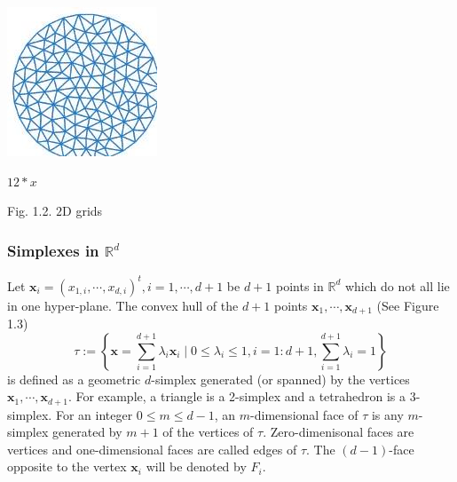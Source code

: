 \documentclass[10pt]{article}
\begin{document}
\includegraphics[max width=\textwidth]{2022_01_05_15c63bf4a948497c30d9g-05(2)}

$12 * x$

Fig. 1.2. $2 \mathrm{D}$ grids

\subsubsection{Simplexes in $\mathbb{R}^{d}$}
Let $\boldsymbol{x}_{i}=\left(x_{1, i}, \cdots, x_{d, i}\right)^{t}, i=1, \cdots, d+1$ be $d+1$ points in $\mathbb{R}^{d}$ which do not all lie in one hyper-plane. The convex hull of the $d+1$ points $\boldsymbol{x}_{1}, \cdots, \boldsymbol{x}_{d+1}$ (See Figure 1.3)
$$
\tau:=\left\{\boldsymbol{x}=\sum_{i=1}^{d+1} \lambda_{i} \boldsymbol{x}_{i} \mid 0 \leq \lambda_{i} \leq 1, i=1: d+1, \sum_{i=1}^{d+1} \lambda_{i}=1\right\}
$$
is defined as a geometric $d$-simplex generated (or spanned) by the vertices $\boldsymbol{x}_{1}, \cdots, \boldsymbol{x}_{d+1} .$ For example, a triangle is a 2-simplex and a tetrahedron is a 3-simplex. For an integer $0 \leq m \leq d-1$, an $m$-dimensional face of $\tau$ is any $m$-simplex generated by $m+1$ of the vertices of $\tau$. Zero-dimenisonal faces are vertices and one-dimensional faces are called edges of $\tau .$ The $(d-1)$-face opposite to the vertex $\boldsymbol{x}_{i}$ will be denoted by $F_{i}$.
\end{document}
